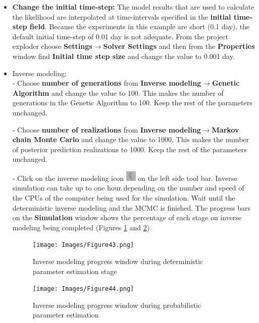\begin{itemize}
\item \textbf{Change the initial time-step: } The model results that are used to calculate the likelihood are interpolated at time-intervals specified in the \textbf{initial time-step field}. Because the experiments in this example are short (0.1 day), the default initial time-step of 0.01 day is not adequate. From the project exploder choose \textbf{Settings}$\rightarrow$\textbf{Solver Settings} and then from the \textbf{Properties} window find \textbf{Initial time step size} and change the value to 0.001 day. 

\item{Inverse modeling: }\\ - Choose \textbf{number of generations} from \textbf{Inverse modeling}$\rightarrow$\textbf{Genetic Algorithm} and change the value to 100. This makes the number of generations in the Genetic Algorithm to 100. Keep the rest of the parameters unchanged.

 - Choose \textbf{number of realizations} from \textbf{Inverse modeling}$\rightarrow$\textbf{Markov chain Monte Carlo} and change the value to 1000. This makes the number of posterior prediction realizations to 1000. Keep the rest of the parameters unchanged. 

- Click on the inverse modeling icon \includegraphics[width=0.5cm]{Icons/inverse_icon.png} on the left side tool bar. Inverse simulation can take up to one hour depending on the number and speed of the CPUs of the computer being used for the simulation. Wait until the deterministic inverse modeling and the MCMC is finished. The progress bars on the \textbf{Simulation} window shows the percentage of each stage on inverse modeling being completed (Figures \ref{fig:43} and \ref{fig:44}). 

\begin{figure}[!ht]
\begin{center}
\texttt{[image: Images/Figure43.png]} \\
\caption{Inverse modeling progress window during deterministic parameter estimation stage}\label{fig:43}
\end{center}
\end{figure}  

\begin{figure}[!ht]
\begin{center}
\texttt{[image: Images/Figure44.png]} \\
\caption{Inverse modeling progress window during probabilistic parameter estimation}\label{fig:44}
\end{center}
\end{figure}  




\end{itemize}
